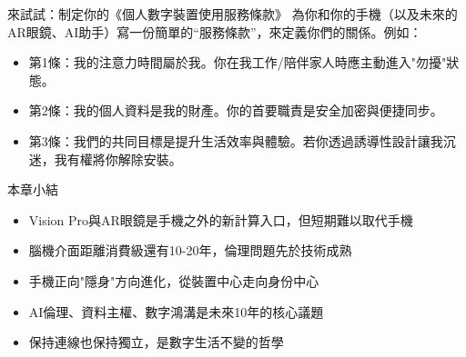 \begin{tcbpractice}{來試試：制定你的《個人數字裝置使用服務條款》}
為你和你的手機（以及未來的AR眼鏡、AI助手）寫一份簡單的“服務條款”，來定義你們的關係。例如：

\begin{itemize}
  \item 第1條：我的注意力時間屬於我。你在我工作/陪伴家人時應主動進入"勿擾"狀態。
  \item 第2條：我的個人資料是我的財產。你的首要職責是安全加密與便捷同步。
  \item 第3條：我們的共同目標是提升生活效率與體驗。若你透過誘導性設計讓我沉迷，我有權將你解除安裝。
\end{itemize}

\end{tcbpractice}

\begin{tcbsummary}{本章小結}
\begin{itemize}
  \item Vision Pro與AR眼鏡是手機之外的新計算入口，但短期難以取代手機
  \item 腦機介面距離消費級還有10-20年，倫理問題先於技術成熟
  \item 手機正向"隱身"方向進化，從裝置中心走向身份中心
  \item AI倫理、資料主權、數字鴻溝是未來10年的核心議題
  \item 保持連線也保持獨立，是數字生活不變的哲學
\end{itemize}

\end{tcbsummary}
